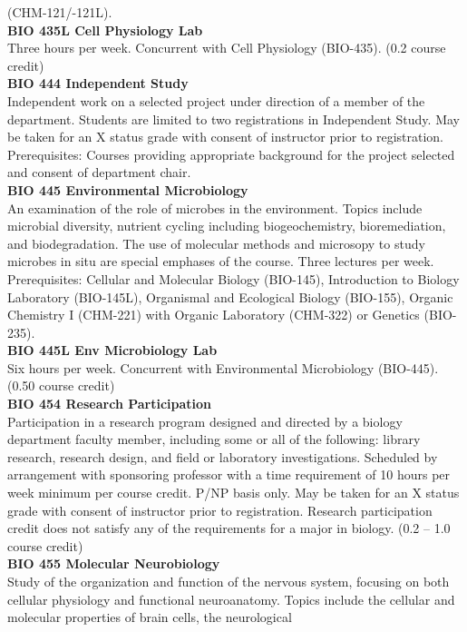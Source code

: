 \documentclass[
  letterpaper,
]{scrbook}
\begin{document}
(CHM-121/-121L).\\
\textbf{BIO 435L Cell Physiology Lab}\\
Three hours per week. Concurrent with Cell Physiology (BIO-435). (0.2
course credit)\\
\textbf{BIO 444 Independent Study}\\
Independent work on a selected project under direction of a member of
the department. Students are limited to two registrations in Independent
Study. May be taken for an X status grade with consent of instructor
prior to registration. Prerequisites: Courses providing appropriate
background for the project selected and consent of department chair.\\
\textbf{BIO 445 Environmental Microbiology}\\
An examination of the role of microbes in the environment. Topics
include microbial diversity, nutrient cycling including biogeochemistry,
bioremediation, and biodegradation. The use of molecular methods and
microsopy to study microbes in situ are special emphases of the course.
Three lectures per week. Prerequisites: Cellular and Molecular Biology
(BIO-145), Introduction to Biology Laboratory (BIO-145L), Organismal and
Ecological Biology (BIO-155), Organic Chemistry I (CHM-221) with Organic
Laboratory (CHM-322) or Genetics (BIO-235).\\
\textbf{BIO 445L Env Microbiology Lab}\\
Six hours per week. Concurrent with Environmental Microbiology
(BIO-445). (0.50 course credit)\\
\textbf{BIO 454 Research Participation}\\
Participation in a research program designed and directed by a biology
department faculty member, including some or all of the following:
library research, research design, and field or laboratory
investigations. Scheduled by arrangement with sponsoring professor with
a time requirement of 10 hours per week minimum per course credit. P/NP
basis only. May be taken for an X status grade with consent of
instructor prior to registration. Research participation credit does not
satisfy any of the requirements for a major in biology. (0.2 -- 1.0
course credit)\\
\textbf{BIO 455 Molecular Neurobiology}\\
Study of the organization and function of the nervous system, focusing
on both cellular physiology and functional neuroanatomy. Topics include
the cellular and molecular properties of brain cells, the neurological
\end{document}
